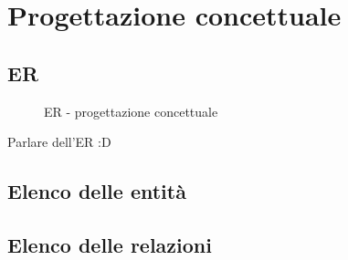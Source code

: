 \section{Progettazione concettuale}
\subsection{ER}
\begin{figure}
    \centering
    \caption{ER - progettazione concettuale}
    
    \label{fig:er_conp}
\end{figure}

Parlare dell'ER :D

\subsection{Elenco delle entità}
\subsection{Elenco delle relazioni}